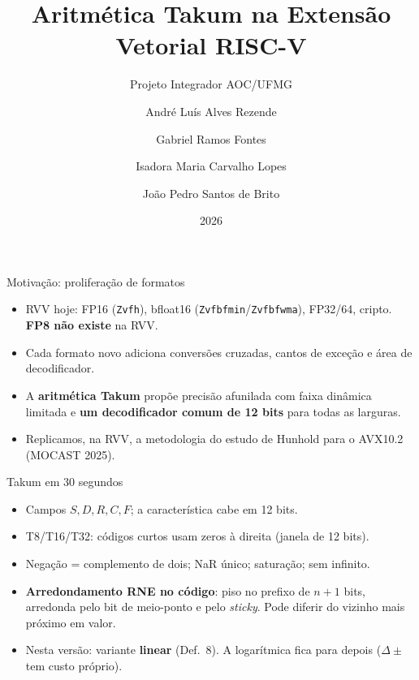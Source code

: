 \documentclass[aspectratio=169,10pt]{beamer}
\title[Takum na RVV]{Aritmética Takum na Extensão Vetorial RISC-V}
\subtitle{Projeto Integrador AOC/UFMG}
\author{André Luís Alves Rezende \and Gabriel Ramos Fontes \and Isadora Maria Carvalho Lopes
\and João Pedro Santos de Brito}
\institute{Departamento de Engenharia Eletrônica -- UFMG}
\date{2026}
\begin{document}
\begin{frame}
	\titlepage
\end{frame}

\begin{frame}{Motivação: proliferação de formatos}
	\begin{itemize}
		\item RVV hoje: FP16 (\texttt{Zvfh}), bfloat16
		      (\texttt{Zvfbfmin}/\texttt{Zvfbfwma}), FP32/64, cripto.
		      \textbf{FP8 não existe} na RVV.
		\item Cada formato novo adiciona conversões cruzadas, cantos de exceção
		      e área de decodificador.
		\item A \textbf{aritmética Takum} propõe precisão afunilada com faixa
		      dinâmica limitada e \textbf{um decodificador comum de 12 bits}
		      para todas as larguras.
		\item Replicamos, na RVV, a metodologia do estudo de Hunhold para o
		      AVX10.2 (MOCAST 2025).
	\end{itemize}
\end{frame}

\begin{frame}{Takum em 30 segundos}
	\begin{itemize}
		\item Campos $S, D, R, C, F$; a característica cabe em 12 bits.
		\item T8/T16/T32: códigos curtos usam zeros à direita (janela de 12 bits).
		\item Negação = complemento de dois; NaR único; saturação; sem infinito.
		\item \textbf{Arredondamento RNE no código}: piso no prefixo de $n+1$
		      bits, arredonda pelo bit de meio-ponto e pelo \emph{sticky}.
		      Pode diferir do vizinho mais próximo em valor.
		\item Nesta versão: variante \textbf{linear} (Def.~8).
		      A logarítmica fica para depois ($\Delta\pm$ tem custo próprio).
	\end{itemize}
\end{frame}
\end{document}

